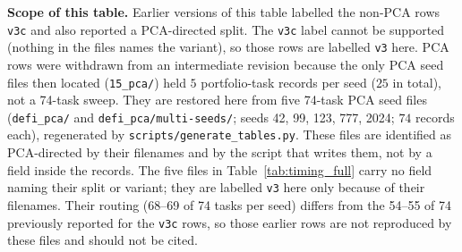 \documentclass[twoside,11pt]{article}
\begin{document}
\textbf{Scope of this table.} Earlier versions of this table labelled the
non-PCA rows \texttt{v3c} and also reported a PCA-directed split. The \texttt{v3c}
label cannot be supported (nothing in the files names the variant), so those rows are
labelled \texttt{v3} here. PCA rows were withdrawn from an intermediate revision
because the only PCA seed files then located (\texttt{15\_pca/}) held $5$
portfolio-task records per seed ($25$ in total), not a 74-task sweep. They are restored here
from five 74-task PCA seed files (\texttt{defi\_pca/} and \texttt{defi\_pca/multi-seeds/};
seeds 42, 99, 123, 777, 2024; $74$ records each), regenerated by
\texttt{scripts/generate\_tables.py}. These files are identified as PCA-directed by their
filenames and by the script that writes them, not by a field inside the records. The five
files in Table~\ref{tab:timing_full} carry no field naming their split or
variant; they are labelled \texttt{v3} here only because of their filenames.
Their routing (68--69 of 74 tasks per seed) differs from the 54--55 of 74
previously reported for the \texttt{v3c} rows, so those earlier rows are not
reproduced by these files and should not be cited.
\end{document}
